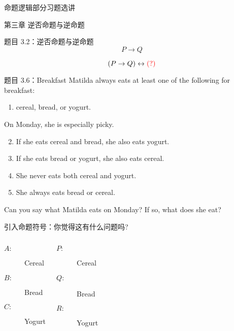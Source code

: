 \begin{frame}{}
  \centerline{\LARGE 命题逻辑部分习题选讲}
  \vspace{0.50cm}
  \centerline{\large 第三章 \; 逆否命题与逆命题}
\end{frame}

\begin{frame}{}
  \begin{exampleblock}{题目 3.2：逆否命题与逆命题}
    \[
      P \to Q
    \]
  \end{exampleblock}

  \[
    (P \to Q) \leftrightarrow \textcolor{red}{(?)}
  \]
\end{frame}

\begin{frame}{}
  \begin{exampleblock}{题目 3.6：Breakfast}
    Matilda always eats at least one of the following for breakfast: \\
    \begin{enumerate}
      \item cereal, bread, or yogurt. 
    \end{enumerate}
    On Monday, she is especially picky.

    \begin{enumerate}
      \setcounter{enumi}{1}
      \item If she eats cereal and bread, she also eats yogurt.
      \item If she eats bread or yogurt, she also eats cereal.
      \item She never eats both cereal and yogurt.
      \item She always eats bread or cereal.
    \end{enumerate}

    Can you say what Matilda eats on Monday? If so, what does she eat?
  \end{exampleblock}
\end{frame}

\begin{frame}{}
  引入命题符号：你觉得这有什么问题吗?
  \begin{columns}
      \begin{description}
	\item[$A:$] Cereal
	\item[$B:$] Bread
	\item[$C:$] Yogurt
      \end{description}
      \begin{description}
	\item[$P:$] Cereal
	\item[$Q:$] Bread
	\item[$R:$] Yogurt
      \end{description}
  \end{columns}

  \vspace{0.30cm}
  \pause
\end{frame}

